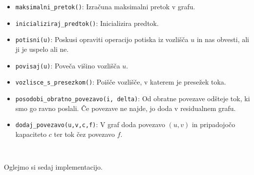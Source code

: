 \documentclass[mat1]{fmfdelo}
\begin{document}
\begin{itemize}
\item \texttt{maksimalni\_pretok()}: Izračuna maksimalni pretok v grafu.
\item \texttt{inicializiraj\_predtok()}: Inicializira predtok.
\item \texttt{potisni(u)}: Poskusi opraviti operacijo potiska iz vozlišča $u$ in nas obvesti, ali ji je uspelo ali ne.
\item \texttt{povisaj(u)}: Poveča višino vozlišča $u$.
\item \texttt{vozlisce\_s\_presezkom()}: Poišče vozlišče, v katerem je presežek toka.
\item \texttt{posodobi\_obratno\_povezavo(i, delta)}: Od obratne povezave odšteje tok, ki smo go ravno poslali. Če povezave ne najde, jo doda v residualnem grafu.
\item \texttt{dodaj\_povezavo(u,v,c,f)}: V graf doda povezavo $(u,v)$ in pripadojočo kapaciteto $c$ ter tok čez povezavo $f$.
\end{itemize}~

Oglejmo si sedaj implementacijo.
\end{document}
